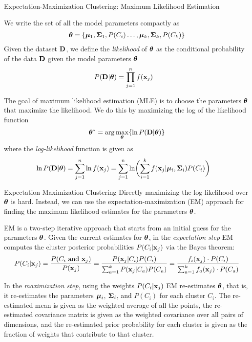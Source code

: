 \begin{frame}{Expectation-Maximization Clustering: Maximum Likelihood Estimation}

  \small
We write the set of all the model parameters compactly as
\begin{align*}
    {\bm \theta} = \left\{{\bm \mu}_1,{\bm \Sigma}_1,P(C_i) \dots, {\bm \mu}_k, {\bm \Sigma}_k,
   P(C_k)\right\}
\end{align*}
Given the dataset $\mathbf{D}$, we def\/{i}ne the {\em likelihood} of
${\bm \theta}$ as the conditional probability of the data $\mathbf{D}$ given
the model parameters ${\bm \theta}$
\begin{align*}
P(\mathbf{D} | {\bm \theta}) & = \prod_{j=1}^n f(\mathbf{x}_{j})
\end{align*}

The goal of maximum likelihood estimation (MLE) is to choose the
parameters ${\bm \theta}$ that maximize the likelihood. We do this by
maximizing the log of the likelihood function
\begin{align*}
    {\bm \theta}^* = \arg\max_{{\bm \theta}} \{\ln P(\mathbf{D} | {\bm \theta})\}
\end{align*}
where the {\em log-likelihood} function is given as
\begin{align*}
    \ln P(\mathbf{D} | {\bm \theta}) & = \sum_{j=1}^n \ln f(\mathbf{x}_{j})
    = \sum_{j=1}^n \ln \biggl( \sum_{i=1}^k f(\mathbf{x}_{j} | {\bm \mu}_i,
{\bm \Sigma}_i)P(C_i)\biggr)
\end{align*}
\end{frame}


\begin{frame}{Expectation-Maximization Clustering}
Directly maximizing the log-likelihood over ${\bm \theta}$ is hard.
Instead, we can use the
expectation-maximization (EM)
approach for f\/{i}nding the maximum likelihood estimates
for the parameters ${\bm \theta}$.

\medskip
EM is a two-step iterative approach that
starts from an initial guess for the parameters ${\bm \theta}$.
Given the current estimates for ${\bm \theta}$, in the {\em expectation step}
EM computes the cluster posterior probabilities $P(C_i|\mathbf{x}_{j})$ via the Bayes
theorem:
\begin{align*}
  P(C_i | \mathbf{x}_{j}) = \frac{P(C_i \mbox{ and } \mathbf{x}_{j})}{P(\mathbf{x}_{j})} =
  \frac{P(\mathbf{x}_{j} | C_i) P(C_i)}{\sum_{a=1}^k P(\mathbf{x}_{j} | C_a) P(C_a)}
 = \frac{f_i(\mathbf{x}_{j}) \cdot P(C_{i})}
    {\sum_{a=1}^k f_a(\mathbf{x}_{j}) \cdot P(C_{a})}
\end{align*}

In the {\em maximization step}, using the weights
$P(C_i|\mathbf{x}_{j})$ EM re-estimates ${\bm \theta}$, that is, it re-estimates the parameters ${\bm \mu}_i$, ${\bm \Sigma}_i$,
and $P(C_i)$ for each cluster $C_i$.
The re-estimated mean is given as the weighted average of
all the points, the re-estimated covariance matrix is given as
the weighted covariance over all pairs of dimensions, and the
re-estimated prior probability for each cluster is given as the
fraction of weights that contribute to that cluster.
\end{frame}



